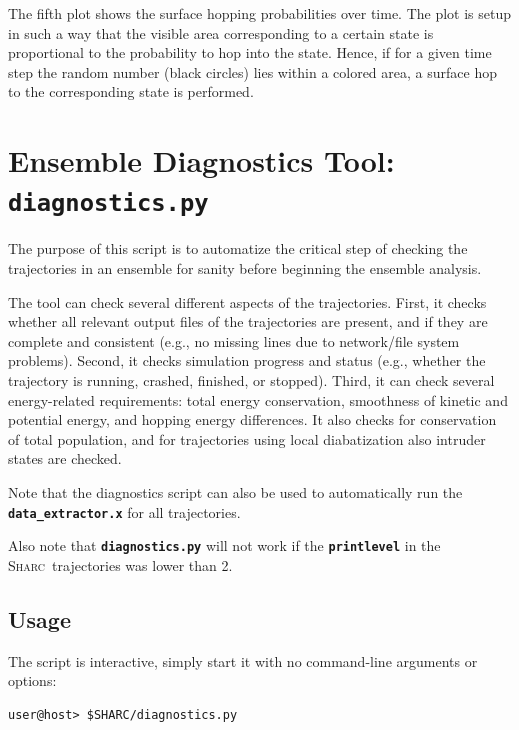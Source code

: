 \documentclass[a4paper,10pt,DIV=15,openany]{scrbook}
\newcommand{\sharc}{\textsc{Sharc}}
\newcommand{\ttt}[1]{\textbf{\texttt{#1}}}
\begin{document}
The fifth plot shows the surface hopping probabilities over time. The plot is setup in such a way that the visible area corresponding to a certain state is proportional to the probability to hop into the state. Hence, if for a given time step the random number (black circles) lies within a colored area, a surface hop to the corresponding state is performed.






\section{Ensemble Diagnostics Tool: \ttt{diagnostics.py}}\label{sec:diagnostics.py}

The purpose of this script is to automatize the critical step of checking the trajectories in an ensemble for sanity before beginning the ensemble analysis.

The tool can check several different aspects of the trajectories.
First, it checks whether all relevant output files of the trajectories are present, and if they are complete and consistent (e.g., no missing lines due to network/file system problems).
Second, it checks simulation progress and status (e.g., whether the trajectory is running, crashed, finished, or stopped).
Third, it can check several energy-related requirements: total energy conservation, smoothness of kinetic and potential energy, and hopping energy differences.
It also checks for conservation of total population, and for trajectories using local diabatization also intruder states are checked.

Note that the diagnostics script can also be used to automatically run the \ttt{data\_extractor.x} for all trajectories.

Also note that \ttt{diagnostics.py} will not work if the \ttt{printlevel} in the \sharc\ trajectories was lower than 2.

\subsection{Usage}

The script is interactive, simply start it with no command-line arguments or options:
\begin{verbatim}
user@host> $SHARC/diagnostics.py
\end{verbatim}
\end{document}
